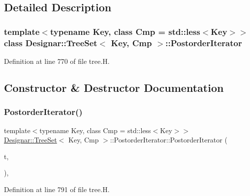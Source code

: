 \subsection{Detailed Description}
\subsubsection*{template$<$typename Key, class Cmp = std\+::less$<$\+Key$>$$>$\newline
class Designar\+::\+Tree\+Set$<$ Key, Cmp $>$\+::\+Postorder\+Iterator}



Definition at line 770 of file tree.\+H.



\subsection{Constructor \& Destructor Documentation}
\mbox{\label{class_designar_1_1_tree_set_1_1_postorder_iterator_ab562263cb488221eb2cfc53b9785a0e6}} 
\subsubsection{\texorpdfstring{Postorder\+Iterator()}{PostorderIterator()}\hspace{0.1cm}{\footnotesize\ttfamily [1/4]}}
{\footnotesize\ttfamily template$<$typename Key, class Cmp = std\+::less$<$\+Key$>$$>$ \\
\hyperlink{class_designar_1_1_tree_set}{Designar\+::\+Tree\+Set}$<$ Key, Cmp $>$\+::Postorder\+Iterator\+::\+Postorder\+Iterator (\begin{DoxyParamCaption}\item[{const \hyperlink{class_designar_1_1_tree_set}{Tree\+Set} \&}]{t,  }\item[{int}]{ }\end{DoxyParamCaption})\hspace{0.3cm}{\ttfamily [inline]}, {\ttfamily [protected]}}



Definition at line 791 of file tree.\+H.

